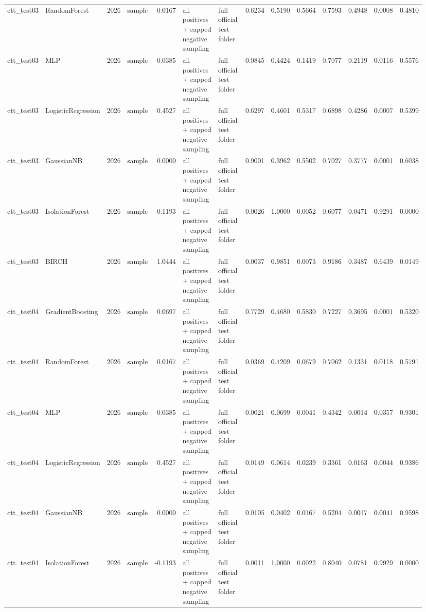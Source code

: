 \begin{tabular}{llrlrllrrrrrrr}
ctt\_test03 & RandomForest & 2026 & sample & 0.0167 & all positives + capped negative sampling & full official test folder & 0.6234 & 0.5190 & 0.5664 & 0.7593 & 0.4948 & 0.0008 & 0.4810 \\
ctt\_test03 & MLP & 2026 & sample & 0.0385 & all positives + capped negative sampling & full official test folder & 0.0845 & 0.4424 & 0.1419 & 0.7077 & 0.2119 & 0.0116 & 0.5576 \\
ctt\_test03 & LogisticRegression & 2026 & sample & 0.4527 & all positives + capped negative sampling & full official test folder & 0.6297 & 0.4601 & 0.5317 & 0.6898 & 0.4286 & 0.0007 & 0.5399 \\
ctt\_test03 & GaussianNB & 2026 & sample & 0.0000 & all positives + capped negative sampling & full official test folder & 0.9001 & 0.3962 & 0.5502 & 0.7027 & 0.3777 & 0.0001 & 0.6038 \\
ctt\_test03 & IsolationForest & 2026 & sample & -0.1193 & all positives + capped negative sampling & full official test folder & 0.0026 & 1.0000 & 0.0052 & 0.6077 & 0.0471 & 0.9291 & 0.0000 \\
ctt\_test03 & BIRCH & 2026 & sample & 1.0444 & all positives + capped negative sampling & full official test folder & 0.0037 & 0.9851 & 0.0073 & 0.9186 & 0.3487 & 0.6439 & 0.0149 \\
ctt\_test04 & GradientBoosting & 2026 & sample & 0.0697 & all positives + capped negative sampling & full official test folder & 0.7729 & 0.4680 & 0.5830 & 0.7227 & 0.3695 & 0.0001 & 0.5320 \\
ctt\_test04 & RandomForest & 2026 & sample & 0.0167 & all positives + capped negative sampling & full official test folder & 0.0369 & 0.4209 & 0.0679 & 0.7062 & 0.1331 & 0.0118 & 0.5791 \\
ctt\_test04 & MLP & 2026 & sample & 0.0385 & all positives + capped negative sampling & full official test folder & 0.0021 & 0.0699 & 0.0041 & 0.4342 & 0.0014 & 0.0357 & 0.9301 \\
ctt\_test04 & LogisticRegression & 2026 & sample & 0.4527 & all positives + capped negative sampling & full official test folder & 0.0149 & 0.0614 & 0.0239 & 0.3361 & 0.0163 & 0.0044 & 0.9386 \\
ctt\_test04 & GaussianNB & 2026 & sample & 0.0000 & all positives + capped negative sampling & full official test folder & 0.0105 & 0.0402 & 0.0167 & 0.5204 & 0.0017 & 0.0041 & 0.9598 \\
ctt\_test04 & IsolationForest & 2026 & sample & -0.1193 & all positives + capped negative sampling & full official test folder & 0.0011 & 1.0000 & 0.0022 & 0.8040 & 0.0781 & 0.9929 & 0.0000 \\

\end{tabular}
